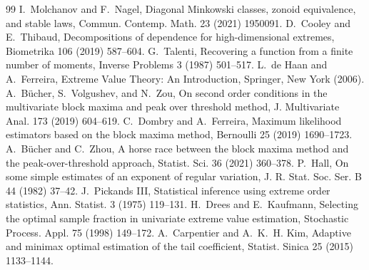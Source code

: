 \documentclass[11pt]{article}
\theoremstyle{definition}
\begin{document}
\begin{thebibliography}{99}
 I.~Molchanov and F.~Nagel, Diagonal Minkowski classes, zonoid equivalence, and stable laws, Commun. Contemp. Math. 23 (2021) 1950091.
 D.~Cooley and E.~Thibaud, Decompositions of dependence for high-dimensional extremes, Biometrika 106 (2019) 587--604.
 G.~Talenti, Recovering a function from a finite number of moments, Inverse Problems 3 (1987) 501--517.
 L.~de Haan and A.~Ferreira, Extreme Value Theory: An Introduction, Springer, New York (2006).
 A.~B\"ucher, S.~Volgushev, and N.~Zou, On second order conditions in the multivariate block maxima and peak over threshold method, J. Multivariate Anal. 173 (2019) 604--619.
 C.~Dombry and A.~Ferreira, Maximum likelihood estimators based on the block maxima method, Bernoulli 25 (2019) 1690--1723.
 A.~B\"ucher and C.~Zhou, A horse race between the block maxima method and the peak-over-threshold approach, Statist. Sci. 36 (2021) 360--378.
 P.~Hall, On some simple estimates of an exponent of regular variation, J. R. Stat. Soc. Ser. B 44 (1982) 37--42.
 J.~Pickands III, Statistical inference using extreme order statistics, Ann. Statist. 3 (1975) 119--131.
 H.~Drees and E.~Kaufmann, Selecting the optimal sample fraction in univariate extreme value estimation, Stochastic Process. Appl. 75 (1998) 149--172.
 A.~Carpentier and A.~K.~H. Kim, Adaptive and minimax optimal estimation of the tail coefficient, Statist. Sinica 25 (2015) 1133--1144.
\end{thebibliography}
\end{document}
